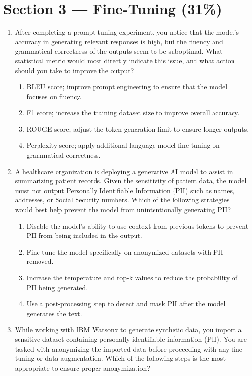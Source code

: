 \section*{Section 3 --- Fine-Tuning (31\%)}

\begin{enumerate}[resume,leftmargin=*]
\item After completing a prompt-tuning experiment, you notice that the model's accuracy in generating relevant responses is high, but the fluency and grammatical correctness of the outputs seem to be suboptimal. What statistical metric would most directly indicate this issue, and what action should you take to improve the output?
\begin{enumerate}[label=\Alph*.]
  \item BLEU score; improve prompt engineering to ensure that the model focuses on fluency.
  \item F1 score; increase the training dataset size to improve overall accuracy.
  \item ROUGE score; adjust the token generation limit to ensure longer outputs.
  \item Perplexity score; apply additional language model fine-tuning on grammatical correctness.
\end{enumerate}
\item A healthcare organization is deploying a generative AI model to assist in summarizing patient records. Given the sensitivity of patient data, the model must not output Personally Identifiable Information (PII) such as names, addresses, or Social Security numbers. Which of the following strategies would best help prevent the model from unintentionally generating PII?
\begin{enumerate}[label=\Alph*.]
  \item Disable the model's ability to use context from previous tokens to prevent PII from being included in the output.
  \item Fine-tune the model specifically on anonymized datasets with PII removed.
  \item Increase the temperature and top-k values to reduce the probability of PII being generated.
  \item Use a post-processing step to detect and mask PII after the model generates the text.
\end{enumerate}
\item While working with IBM Watsonx to generate synthetic data, you import a sensitive dataset containing personally identifiable information (PII). You are tasked with anonymizing the imported data before proceeding with any fine-tuning or data augmentation. Which of the following steps is the most appropriate to ensure proper anonymization?

\end{enumerate}
